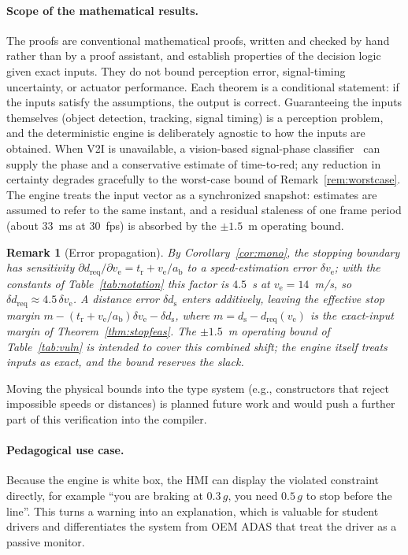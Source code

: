 \documentclass[conference, a4paper]{IEEEtran}
\theoremstyle{plain}
\newtheorem{remark}[theorem]{Remark}
\newcommand{\dreq}{d_{\mathrm{req}}}
\newcommand{\ds}{d_{\mathrm{s}}}
\newcommand{\ab}{a_{\mathrm{b}}}
\newcommand{\tr}{t_{\mathrm{r}}}
\newcommand{\ve}{v_{\mathrm{e}}}
\begin{document}
\paragraph{Scope of the mathematical results.} The proofs are conventional
mathematical proofs, written and checked by hand rather than by a proof
assistant, and establish properties of
the decision logic given exact inputs. They do not bound perception error,
signal-timing uncertainty, or actuator performance. Each theorem is a
conditional statement: if the inputs satisfy the assumptions, the output is
correct. Guaranteeing the inputs themselves (object detection, tracking,
signal timing) is a perception problem, and the deterministic engine is
deliberately agnostic to how the inputs are obtained. When V2I is
unavailable, a vision-based signal-phase classifier~\cite{behrendt2017} can
supply the phase and a conservative estimate of time-to-red; any reduction
in certainty degrades gracefully to the worst-case bound of
Remark~\ref{rem:worstcase}. The engine treats the input vector as a
synchronized snapshot: estimates are assumed to refer to the same instant,
and a residual staleness of one frame period (about $33$~ms at 30~fps) is
absorbed by the $\pm 1.5$~m operating bound.

\begin{remark}[Error propagation]
By Corollary~\ref{cor:mono}, the stopping boundary has sensitivity
$\partial \dreq / \partial \ve = \tr + \ve/\ab$ to a speed-estimation
error $\delta\ve$; with the constants of Table~\ref{tab:notation} this
factor is $4.5$~s at $\ve = 14$~m/s, so $\delta \dreq \approx 4.5\,
\delta\ve$. A distance error $\delta\ds$ enters additively, leaving the
effective stop margin $m - (\tr + \ve/\ab)\delta\ve - \delta\ds$,
where $m = \ds - \dreq(\ve)$ is the exact-input margin of
Theorem~\ref{thm:stopfeas}. The $\pm 1.5$~m operating bound of
Table~\ref{tab:vuln} is intended to cover this combined shift; the engine
itself treats inputs as exact, and the bound reserves the slack.
\end{remark} Moving the physical
bounds into the type system (e.g., constructors that reject impossible
speeds or distances) is planned future work and would push a further part of
this verification into the compiler.

\paragraph{Pedagogical use case.} Because the engine is white box, the HMI
can display the violated constraint directly, for example ``you are braking
at $0.3\,g$, you need $0.5\,g$ to stop before the line''. This turns a
warning into an explanation, which is valuable for student drivers and
differentiates the system from OEM ADAS that treat the driver as a passive
monitor.
\end{document}
